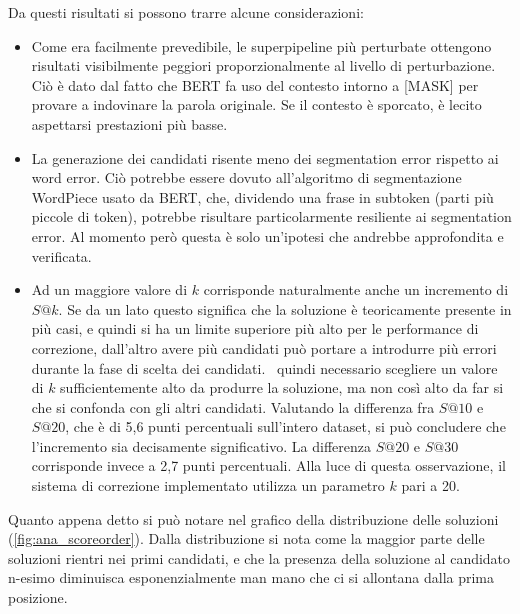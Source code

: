 \noindent
Da questi risultati si possono trarre alcune considerazioni:
\begin{itemize}
\item Come era facilmente prevedibile, le superpipeline più perturbate ottengono risultati visibilmente peggiori proporzionalmente al livello di perturbazione. Ciò è dato dal fatto che BERT fa uso del contesto intorno a [MASK] per provare a indovinare la parola originale. Se il contesto è sporcato, è lecito aspettarsi prestazioni più basse.

\item La generazione dei candidati risente meno dei segmentation error rispetto ai word error. Ciò potrebbe essere dovuto all'algoritmo di segmentazione WordPiece usato da BERT, che, dividendo una frase in subtoken (parti più piccole di token), potrebbe risultare particolarmente resiliente ai segmentation error. Al momento però questa è solo un'ipotesi che andrebbe approfondita e verificata.

\item Ad un maggiore valore di $k$ corrisponde naturalmente anche un incremento di $S@k$. Se da un lato questo significa che la soluzione è teoricamente presente in più casi, e quindi si ha un limite superiore più alto per le performance di correzione, dall'altro avere più candidati può portare a introdurre più errori durante la fase di scelta dei candidati. \E\ quindi necessario scegliere un valore di $k$ sufficientemente alto da produrre la soluzione, ma non così alto da far si che si confonda con gli altri candidati. Valutando la differenza fra $S@10$ e $S@20$, che è di 5,6 punti percentuali sull'intero dataset, si può concludere che l'incremento sia decisamente significativo. La differenza $S@20$ e $S@30$ corrisponde invece a 2,7 punti percentuali. Alla luce di questa osservazione, il sistema di correzione implementato utilizza un parametro $k$ pari a 20.
\end{itemize}

Quanto appena detto si può notare nel grafico della distribuzione delle soluzioni (\autoref{fig:ana_scoreorder}). Dalla distribuzione si nota come la maggior parte delle soluzioni rientri nei primi candidati, e che la presenza della soluzione al candidato n-esimo diminuisca esponenzialmente man mano che ci si allontana dalla prima posizione.



